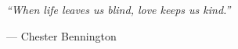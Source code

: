 \documentclass[11pt,oneside]{memoir}
\begin{document}
\vfill
\begin{center}

\textit{“When life leaves us blind, love keeps us kind.”}

--- Chester Bennington
\end{center}



\backmatter
\end{document}
